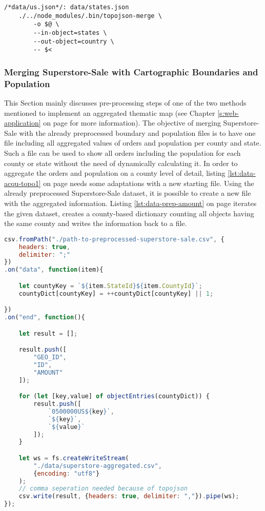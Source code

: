 \begin{lstlisting}[style={makefile}, caption={Make task for converting state boundaries to a county boundary}, label={lst:data-acqu-topo3}]
/*data/us.json*/: data/states.json
    ./../node_modules/.bin/topojson-merge \
        -o $@ \
        --in-object=states \
        --out-object=country \
        -- $<
\end{lstlisting}

\subsubsection{Merging Superstore-Sale with Cartographic Boundaries and Population}
This Section mainly discusses pre-processing steps of one of the two methods mentioned to implement an aggregated thematic map (see Chapter \ref{s:web-application} on page \pageref{s:web-application} for more information). The objective of merging Superstore-Sale with the already preprocessed boundary and population files is to have one file including all aggregated values of orders and population per county and state. Such a file can be used to show all orders including the population for each county or state without the need of dynamically calculating it.
In order to aggregate the orders and population on a county level of detail, listing \ref{lst:data-acqu-topo1} on page \pageref{lst:data-acqu-topo1} needs some adaptations with a new starting file. Using the already preprocessed Superstore-Sale dataset, it is possible to create a new file with the aggregated information. Listing \ref{lst:data-prep-amount} on page \pageref{lst:data-prep-amount} iterates the given dataset, creates a county-based dictionary counting all objects having the same county and writes the information back to a file.

\begin{lstlisting}[language=JavaScript, caption={Creating the file containing aggregation information}, label={lst:data-prep-amount}]
csv.fromPath("./path-to-preprocessed-superstore-sale.csv", {
    headers: true,
    delimiter: ";"
})
.on("data", function(item){

    let countyKey = `${item.StateId}${item.CountyId}`;
    countyDict[countyKey] = ++countyDict[countyKey] || 1;

})
.on("end", function(){

    let result = [];

    result.push([
        "GEO_ID",
        "ID",
        "AMOUNT"
    ]);

    for (let [key,value] of objectEntries(countyDict)) {
        result.push([
            `0500000US${key}`,
            `${key}`,
            `${value}`
        ]);
    }

    let ws = fs.createWriteStream(
        "./data/superstore-aggregated.csv",
        {encoding: "utf8"}
    );
    // comma seperation needed because of topojson
    csv.write(result, {headers: true, delimiter: ","}).pipe(ws);
});
\end{lstlisting}

